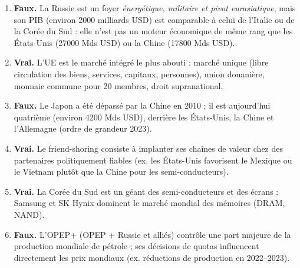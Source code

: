 \documentclass[11pt]{article}
\newcommand{\cle}[1]{{\popxbold\color{popdark}#1}}
\begin{document}
\begin{corrige}
\begin{enumerate}
\item \textbf{Faux.} La Russie est un foyer \emph{énergétique, militaire et pivot eurasiatique}, mais son PIB (environ \num{2000} milliards USD) est comparable à celui de l'Italie ou de la Corée du Sud : elle n'est pas un moteur économique de même rang que les États-Unis (\num{27000} Mds USD) ou la Chine (\num{17800} Mds USD).
\item \textbf{Vrai.} L'UE est le marché intégré le plus abouti : marché unique (libre circulation des biens, services, capitaux, personnes), union douanière, monnaie commune pour 20 membres, droit supranational.
\item \textbf{Faux.} Le Japon a été dépassé par la Chine en 2010 ; il est aujourd'hui quatrième (environ \num{4200} Mds USD), derrière les États-Unis, la Chine et l'Allemagne (ordre de grandeur 2023).
\item \textbf{Vrai.} Le \cle{friend-shoring} consiste à implanter ses chaînes de valeur chez des partenaires politiquement fiables (ex. les États-Unis favorisent le Mexique ou le Vietnam plutôt que la Chine pour les semi-conducteurs).
\item \textbf{Vrai.} La Corée du Sud est un géant des semi-conducteurs et des écrans : Samsung et SK Hynix dominent le marché mondial des mémoires (DRAM, NAND).
\item \textbf{Faux.} L'OPEP+ (OPEP + Russie et alliés) contrôle une part majeure de la production mondiale de pétrole ; ses décisions de quotas influencent directement les prix mondiaux (ex. réductions de production en 2022--2023).
\end{enumerate}
\end{corrige}
\end{document}
